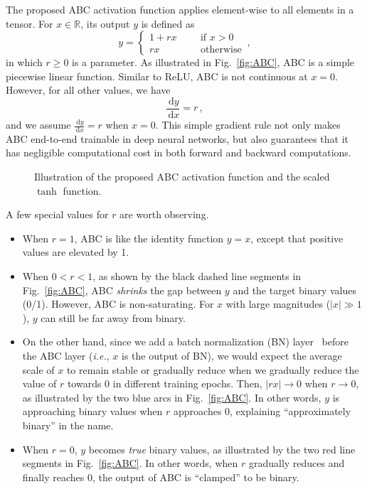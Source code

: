 \documentclass[runningheads]{llncs}
\newcommand{\dx}{\,\mathrm{d}x}
\newcommand{\dy}{\,\mathrm{d}y}
\begin{document}
The proposed ABC activation function applies element-wise to all elements in a tensor. For $x \in \mathbb{R}$, its output $y$ is defined as 
\begin{equation}
y = \left\{ 
\begin{aligned}
1 + rx &&& \text{if $x > 0$} \\
rx &&& \text{otherwise}
\end{aligned}
\right. \,,
\end{equation}
in which $r \ge 0$ is a parameter. As illustrated in Fig.~\ref{fig:ABC}, ABC is a simple piecewise linear function. Similar to ReLU, ABC is not continuous at $x=0$. However, for all other values, we have 
\begin{equation}
\frac{\dy}{\dx} = r \,,
\end{equation}
and we assume $\frac{\dy}{\dx}=r$ when $x=0$. This simple gradient rule not only makes ABC end-to-end trainable in deep neural networks, but also guarantees that it has negligible computational cost in both forward and backward computations.

\begin{figure*}[t]
	\centering
	\hspace{12pt}
	\caption{Illustration of the proposed ABC activation function and the scaled $\tanh$ function.} \label{fig:ABC_Tanh}
\end{figure*}

A few special values for $r$ are worth observing.
\begin{itemize}
	\item When $r=1$, ABC is like the identity function $y=x$, except that positive values are elevated by 1.
	\item When $0<r<1$, as shown by the black dashed line segments in Fig.~\ref{fig:ABC}, ABC \emph{shrinks} the gap between $y$ and the target binary values (0/1). However, ABC is non-saturating. For $x$ with large magnitudes ($|x| \gg 1$), $y$ can still be far away from binary.
	\item On the other hand, since we add a batch normalization (BN) layer~\cite{bn} before the ABC layer (\emph{i.e.}, $x$ is the output of BN), we would expect the average scale of $x$ to remain stable or gradually reduce when we gradually reduce the value of $r$ towards 0 in different training epochs. Then, $|rx| \rightarrow 0$ when $r \rightarrow 0$, as illustrated by the two blue arcs in Fig.~\ref{fig:ABC}. In other words, $y$ is approaching binary values when $r$ approaches 0, explaining ``approximately binary'' in the name.
	\item When $r=0$, $y$ becomes \emph{true} binary values, as illustrated by the two red line segments in Fig.~\ref{fig:ABC}. In other words, when $r$ gradually reduces and finally reaches 0, the output of ABC is ``clamped'' to be binary.
\end{itemize}
\end{document}

